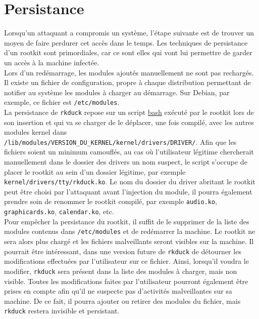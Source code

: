 \documentclass[12pt]{article}
\begin{document}

\section{Persistance}

    Lorsqu'un attaquant a compromis un système, l'étape suivante est de trouver un moyen de faire perdurer cet accès dans le temps. Les techniques de persistance d'un rootkit sont primordiales, car ce sont elles qui vont lui permettre de garder un accès à la machine infectée. \\ 

    Lors d'un redémarrage, les modules ajoutés manuellement ne sont pas rechargés. Il existe un fichier de configuration, propre à chaque distribution permettant de notifier au système les modules à charger au démarrage. Sur Debian, par exemple, ce fichier est \texttt{/etc/modules}. \\

    La persistance de \texttt{rkduck} repose sur un script \href{https://github.com/QuokkaLight/rkduck/blob/master/forever.sh}{bash} exécuté par le rootkit lors de son insertion et qui va se charger de le déplacer, une fois compilé, avec les autres modules kernel dans \texttt{/lib/modules/VERSION\_DU\_KERNEL/kernel/drivers/DRIVER/}. Afin que les fichiers soient un minimum camouflés, au cas où l'utilisateur légitime chercherait manuellement dans le dossier des drivers un nom suspect, le script s'occupe de placer le rootkit au sein d'un dossier légitime, par exemple \texttt{kernel/drivers/tty/rkduck.ko}. Le nom du dossier du driver abritant le rootkit peut être choisi par l'attaquant avant l'injection du module, il pourra également prendre soin de renommer le rootkit compilé, par exemple \texttt{audio.ko}, \texttt{graphicards.ko}, \texttt{calendar.ko}, etc. \\

    Pour empêcher la persistance du rootkit, il suffit de le supprimer de la liste des modules contenus dans \texttt{/etc/modules} et de redémarrer la machine. Le rootkit ne sera alors plus chargé et les fichiers malveillants seront visibles sur la machine. Il pourrait être intéressant, dans une version future de \texttt{rkduck} de détourner les modifications effectuées par l'utilisateur sur ce fichier. Ainsi, lorsqu'il voudra le modifier, \texttt{rkduck} sera présent dans la liste des modules à charger, mais non visible. Toutes les modifications faites par l'utilisateur pourront également être prises en compte afin qu'il ne suspecte pas d'activités malveillantes sur sa machine. De ce fait, il pourra ajouter ou retirer des modules du fichier, mais \texttt{rkduck} restera invisible et persistant.
\end{document}
